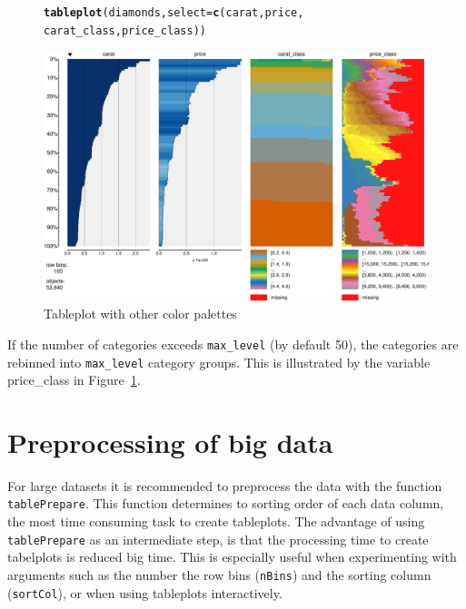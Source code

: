 \documentclass[11pt, fleqn, a4paper]{article}\usepackage{graphicx, color}
\makeatletter
\def\maxwidth{ %
  \ifdim\Gin@nat@width>\linewidth
    \linewidth
  \else
    \Gin@nat@width
  \fi
}
\newcommand{\hlfunctioncall}[1]{\textcolor[rgb]{0.501960784313725,0,0.329411764705882}{\textbf{#1}}}%
\newenvironment{kframe}{%
 \def\at@end@of@kframe{}%
 \ifinner\ifhmode%
  \def\at@end@of@kframe{\end{minipage}}%
  \begin{minipage}{\columnwidth}%
 \fi\fi%
 \def\FrameCommand##1{\hskip\@totalleftmargin \hskip-\fboxsep
 \colorbox{shadecolor}{##1}\hskip-\fboxsep
     \hskip-\linewidth \hskip-\@totalleftmargin \hskip\columnwidth}%
 \MakeFramed {\advance\hsize-\width
   \@totalleftmargin\z@ \linewidth\hsize
   \@setminipage}}%
 {\par\unskip\endMakeFramed%
 \at@end@of@kframe}
\newenvironment{knitrout}{}{} %
\makeatother
\begin{document}
\begin{figure}[htp]
\begin{knitrout}
\color{fgcolor}\begin{kframe}
\begin{alltt}
\hlfunctioncall{tableplot}(diamonds, select = \hlfunctioncall{c}(carat, price, 
    carat_class, price_class))
\end{alltt}
\end{kframe}
\includegraphics[width=\maxwidth]{figure/chunk9} 

\end{knitrout}

\caption{Tableplot with other color palettes}
\label{fig:tphc}
\end{figure}

If the number of categories exceeds {\tt max\_level} (by default 50), the categories are rebinned into {\tt max\_level} category groups. This is illustrated by the variable price\_class in Figure~\ref{fig:tphc}.




\section{Preprocessing of big data}

For large datasets it is recommended to preprocess the data with the function {\tt tablePrepare}. This function determines to sorting order of each data column, the most time consuming task to create tableplots. The advantage of using {\tt tablePrepare} as an intermediate step, is that the processing time to create tabelplots is reduced big time. This is especially useful when experimenting with arguments such as the number the row bins ({\tt nBins}) and the sorting column ({\tt sortCol}), or when using tableplots interactively.
\end{document}
